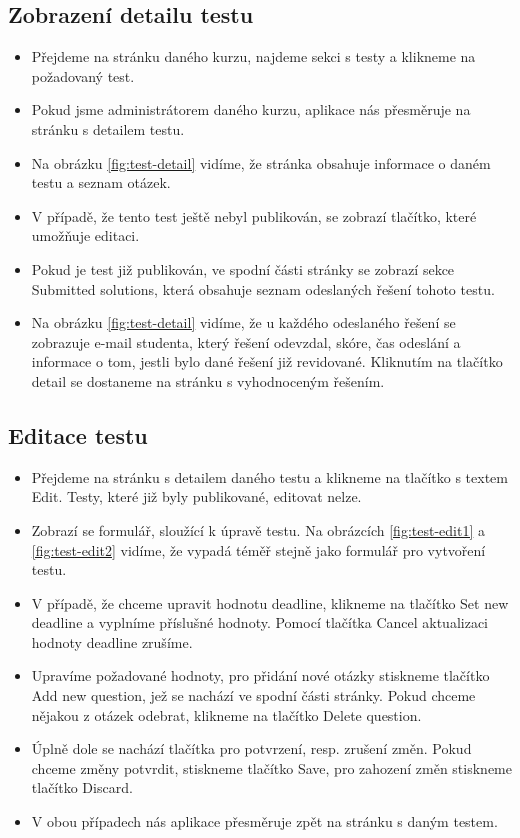 \subsection{Zobrazení detailu testu}
\begin{itemize}
	\item Přejdeme na stránku daného kurzu, najdeme sekci s testy a klikneme na požadovaný test.
	\item Pokud jsme administrátorem daného kurzu, aplikace nás přesměruje na stránku s detailem testu.
	\item Na obrázku \ref{fig:test-detail} vidíme, že stránka obsahuje informace o daném testu a seznam otázek.
	\item V případě, že tento test ještě nebyl publikován, se zobrazí tlačítko, které umožňuje editaci.
	\item Pokud je test již publikován, ve spodní části stránky se zobrazí sekce Submitted solutions, která obsahuje seznam odeslaných řešení tohoto testu.
	\item Na obrázku \ref{fig:test-detail} vidíme, že u každého odeslaného řešení se zobrazuje e-mail studenta, který řešení odevzdal, skóre, čas odeslání a informace o tom, jestli bylo dané řešení již revidované. Kliknutím na tlačítko detail se dostaneme na stránku s vyhodnoceným řešením.
\end{itemize}

\subsection{Editace testu}
\begin{itemize}
	\item Přejdeme na stránku s detailem daného testu a klikneme na tlačítko s textem Edit. Testy, které již byly publikované, editovat nelze.
	\item Zobrazí se formulář, sloužící k úpravě testu. Na obrázcích \ref{fig:test-edit1} a \ref{fig:test-edit2} vidíme, že vypadá téměř stejně jako formulář pro vytvoření testu.
	\item V případě, že chceme upravit hodnotu deadline, klikneme na tlačítko Set new deadline a vyplníme příslušné hodnoty. Pomocí tlačítka Cancel aktualizaci hodnoty deadline zrušíme.
	\item Upravíme požadované hodnoty, pro přidání nové otázky stiskneme tlačítko Add new question, jež se nachází ve spodní části stránky. Pokud chceme nějakou z otázek odebrat, klikneme na tlačítko Delete question.
	\item Úplně dole se nachází tlačítka pro potvrzení, resp. zrušení změn. Pokud chceme změny potvrdit, stiskneme tlačítko Save, pro zahození změn stiskneme tlačítko Discard.
	\item V obou případech nás aplikace přesměruje zpět na stránku s daným testem.
\end{itemize}

